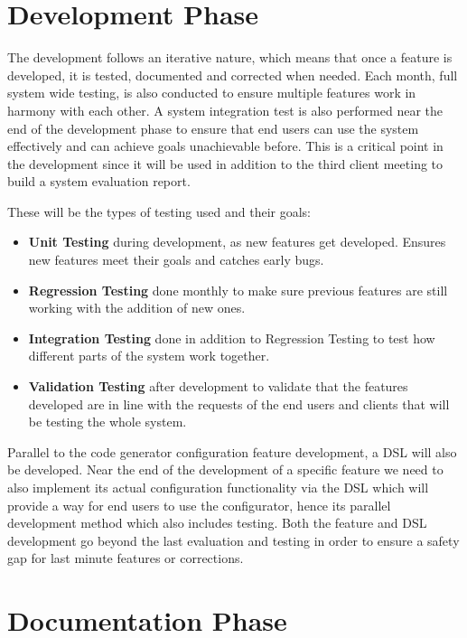 \section{Development Phase}
\label{sec:dev_plan_dev}

The development follows an iterative nature, which means that once a feature is developed, it is tested, documented and corrected when needed. Each month, full system wide testing, is also conducted to ensure multiple features work in harmony with each other. A system integration test is also performed near the end of the development phase to ensure that end users can use the system effectively and can achieve goals unachievable before. This is a critical point in the development since it will be used in addition to the third client meeting to build a system evaluation report.

These will be the types of testing used and their goals:

\begin{itemize}
	\item \textbf{Unit Testing} during development, as new features get developed. Ensures new features meet their goals and catches early bugs.
	\item \textbf{Regression Testing} done monthly to make sure previous features are still working with the addition of new ones.
	\item \textbf{Integration Testing} done in addition to Regression Testing to test how different parts of the system work together.
	\item \textbf{Validation Testing} after development to validate that the features developed are in line with the requests of the end users and clients that will be testing the whole system.
\end{itemize}

Parallel to the code generator configuration feature development, a \gls{DSL} will also be developed. Near the end of the development of a specific feature we need to also implement its actual configuration functionality via the \gls{DSL} which will provide a way for end users to use the configurator, hence its parallel development method which also includes testing. Both the feature and \gls{DSL} development go beyond the last evaluation and testing in order to ensure a safety gap for last minute features or corrections.

\section{Documentation Phase}
\label{sec:dev_plan_doc}

